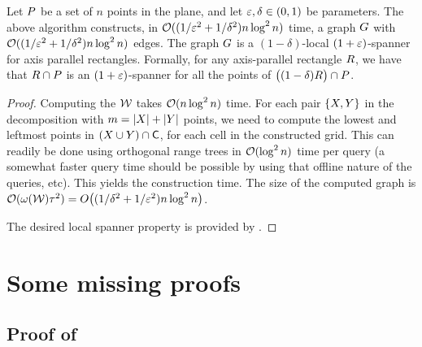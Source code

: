 \documentclass[12pt]{article}%
\begin{document}
\begin{theorem}
    Let $P$ be a set of $n$ points in the plane, and let
    $\varepsilon, \delta \in (0,1)$ be parameters. The above algorithm
    constructs, in $\mathcal{O}((1/\varepsilon^2 + 1/\delta^2) n \log^2 n)$ time, a
    graph $G$ with $\mathcal{O}((1/\varepsilon^2 + 1/\delta^2) n \log^2 n)$
    edges. The graph $G$ is a $(1-\delta)$-local $(1+\varepsilon)$-spanner
    for axis parallel rectangles. Formally, for any axis-parallel
    rectangle $R$, we have that $R \cap P$ is an
    $(1+\varepsilon)$-spanner for all the points of
    $\bigl((1-\delta)R \bigr)\cap P$.
\end{theorem}
\begin{proof}
    Computing the \QSPD $\mathcal{W}$ takes $\mathcal{O}(n \log^2 n)$ time. For each
    pair $\{X, Y\}$ in the decomposition with
    $m = |X| + |Y|$ points, we need to compute the lowest and
    leftmost points in $(X \cup Y) \cap \mathsf{C}$, for each cell in
    the constructed grid. This can readily be done using orthogonal
    range trees in $\mathcal{O}( \log^2 n)$ time per query (a somewhat faster
    query time should be possible by using that offline nature of the
    queries, etc). This yields the construction time. The size of the
    computed graph is
    $\Of(\WeightX{\WS} \gConst^2) = O\bigl((1/\delta^2 + 1/\eps^2) n
    \log^2 n\bigr)$.

    The desired local spanner property is provided by
    .
\end{proof}









% 


\appendix
\section{Some missing proofs}

\subsection{Proof of }

%
{%
    \LemmaChopEasyBody{}
}
\end{document}
